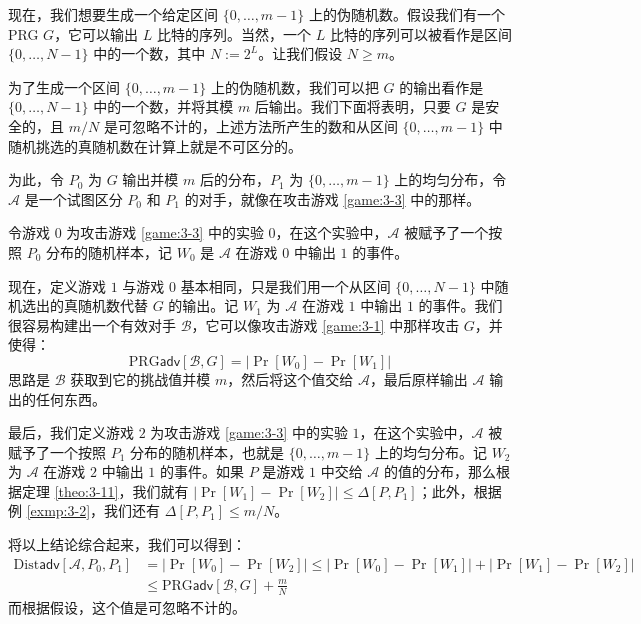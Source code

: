 \begin{example}
现在，我们想要生成一个给定区间 $\{0,\dots,m-1\}$ 上的伪随机数。假设我们有一个PRG $G$，它可以输出 $L$ 比特的序列。当然，一个 $L$ 比特的序列可以被看作是区间 $\{0,\dots,N-1\}$ 中的一个数，其中 $N:=2^L$。让我们假设 $N\geq m$。

为了生成一个区间 $\{0,\dots,m-1\}$ 上的伪随机数，我们可以把 $G$ 的输出看作是 $\{0,\dots,N-1\}$ 中的一个数，并将其模 $m$ 后输出。我们下面将表明，只要 $G$ 是安全的，且 $m/N$ 是可忽略不计的，上述方法所产生的数和从区间 $\{0,\dots,m-1\}$ 中随机挑选的真随机数在计算上就是不可区分的。

为此，令 $P_0$ 为 $G$ 输出并模 $m$ 后的分布，$P_1$ 为 $\{0,\dots,m-1\}$ 上的均匀分布，令 $\mathcal A$ 是一个试图区分 $P_0$ 和 $P_1$ 的对手，就像在攻击游戏 \ref{game:3-3} 中的那样。

令游戏 $0$ 为攻击游戏 \ref{game:3-3} 中的实验 $0$，在这个实验中，$\mathcal A$ 被赋予了一个按照 $P_0$ 分布的随机样本，记 $W_0$ 是 $\mathcal A$ 在游戏 $0$ 中输出 $1$ 的事件。

现在，定义游戏 $1$ 与游戏 $0$ 基本相同，只是我们用一个从区间 $\{0,\dots,N-1\}$ 中随机选出的真随机数代替 $G$ 的输出。记 $W_1$ 为 $\mathcal A$ 在游戏 $1$ 中输出 $1$ 的事件。我们很容易构建出一个有效对手 $\mathcal{B}$，它可以像攻击游戏 \ref{game:3-1} 中那样攻击 $G$，并使得：
\[
\mathrm{PRG}\mathsf{adv}[\mathcal{B},G]
=\big\lvert
\Pr[W_0]-\Pr[W_1]
\big\rvert
\]
思路是 $\mathcal{B}$ 获取到它的挑战值并模 $m$，然后将这个值交给 $\mathcal A$，最后原样输出 $\mathcal A$ 输出的任何东西。

最后，我们定义游戏 $2$ 为攻击游戏 \ref{game:3-3} 中的实验 $1$，在这个实验中，$\mathcal A$ 被赋予了一个按照 $P_1$ 分布的随机样本，也就是 $\{0,\dots,m-1\}$ 上的均匀分布。记 $W_2$ 为 $\mathcal A$ 在游戏 $2$ 中输出 $1$ 的事件。如果 $P$ 是游戏 $1$ 中交给 $\mathcal A$ 的值的分布，那么根据定理 \ref	{theo:3-11}，我们就有 $\big\lvert\Pr[W_1]-\Pr[W_2]\big\rvert\leq\Delta[P,P_1]$；此外，根据例 \ref{exmp:3-2}，我们还有 $\Delta[P,P_1]\leq{m}/{N}$。

将以上结论综合起来，我们可以得到：
\[
\begin{aligned}
\mathrm{Dist}\mathsf{adv}[\mathcal{A},P_0,P_1]
&=\big\lvert\Pr[W_0]-\Pr[W_2]\big\rvert
\leq\big\lvert\Pr[W_0]-\Pr[W_1]\big\rvert+\big\lvert\Pr[W_1]-\Pr[W_2]\big\rvert\\
&\leq\mathrm{PRG}\mathsf{adv}[\mathcal{B},G]+\frac{m}{N}
\end{aligned}
\]
而根据假设，这个值是可忽略不计的。
\end{example}

